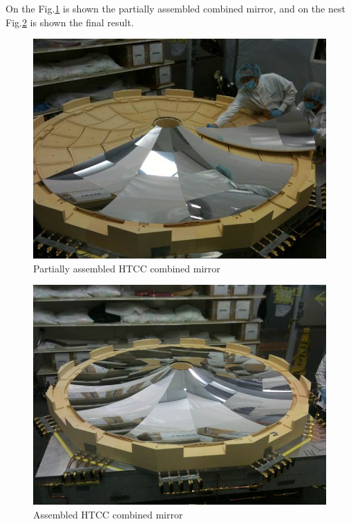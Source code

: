  On the Fig.\ref{fig:Partial_Assembl_MIR} is shown the partially assembled combined mirror, and on the nest Fig.\ref{fig:Compl_Assembl_MIR} is shown the final result. 
 
\begin{figure}[h]
    \centering
    \includegraphics[width=1.0\linewidth]{images/Partial_Assembl_MIR.jpg}
    \caption{ Partially assembled HTCC combined mirror}
    \label{fig:Partial_Assembl_MIR}
\end{figure}

 \begin{figure}[h]
    \centering
    \includegraphics[width=1.0\linewidth]{images/Compl_Assembl_MIR.jpg}
    \caption{Assembled HTCC combined mirror}
    \label{fig:Compl_Assembl_MIR}
\end{figure}


